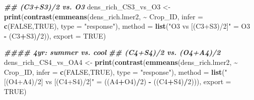 \documentclass[
]{article}
\newenvironment{Shaded}{\begin{snugshade}}{\end{snugshade}}
\newcommand{\AttributeTok}[1]{\textcolor[rgb]{0.13,0.29,0.53}{#1}}
\newcommand{\ConstantTok}[1]{\textcolor[rgb]{0.56,0.35,0.01}{#1}}
\newcommand{\DecValTok}[1]{\textcolor[rgb]{0.00,0.00,0.81}{#1}}
\newcommand{\DocumentationTok}[1]{\textcolor[rgb]{0.56,0.35,0.01}{\textbf{\textit{#1}}}}
\newcommand{\FunctionTok}[1]{\textcolor[rgb]{0.13,0.29,0.53}{\textbf{#1}}}
\newcommand{\NormalTok}[1]{#1}
\newcommand{\OtherTok}[1]{\textcolor[rgb]{0.56,0.35,0.01}{#1}}
\newcommand{\SpecialCharTok}[1]{\textcolor[rgb]{0.81,0.36,0.00}{\textbf{#1}}}
\newcommand{\StringTok}[1]{\textcolor[rgb]{0.31,0.60,0.02}{#1}}
\begin{document}
\begin{Shaded}
\begin{Highlighting}[]
\DocumentationTok{\#\# (C3+S3)/2 vs. O3}
\NormalTok{dens\_rich\_CS3\_vs\_O3 }\OtherTok{\textless{}{-}} \FunctionTok{print}\NormalTok{(}\FunctionTok{contrast}\NormalTok{(}\FunctionTok{emmeans}\NormalTok{(dens\_rich.lmer2, }\SpecialCharTok{\textasciitilde{}}\NormalTok{ Crop\_ID, }
                                              \AttributeTok{infer =} \FunctionTok{c}\NormalTok{(}\ConstantTok{FALSE}\NormalTok{,}\ConstantTok{TRUE}\NormalTok{),}
                                              \AttributeTok{type =} \StringTok{"response"}\NormalTok{),}
                                      \AttributeTok{method =} \FunctionTok{list}\NormalTok{(}\StringTok{"O3 vs [(C3+S3)/2]"} \OtherTok{=}\NormalTok{ O3 }\SpecialCharTok{{-}}\NormalTok{ (C3}\SpecialCharTok{+}\NormalTok{S3)}\SpecialCharTok{/}\DecValTok{2}\NormalTok{)),}
                             \AttributeTok{export =} \ConstantTok{TRUE}\NormalTok{)}

\DocumentationTok{\#\#\#\# 4yr: summer vs. cool}
\DocumentationTok{\#\# (C4+S4)/2 vs. (O4+A4)/2 }
\NormalTok{dens\_rich\_CS4\_vs\_OA4 }\OtherTok{\textless{}{-}} \FunctionTok{print}\NormalTok{(}\FunctionTok{contrast}\NormalTok{(}\FunctionTok{emmeans}\NormalTok{(dens\_rich.lmer2, }\SpecialCharTok{\textasciitilde{}}\NormalTok{ Crop\_ID,}
                                               \AttributeTok{infer =} \FunctionTok{c}\NormalTok{(}\ConstantTok{FALSE}\NormalTok{,}\ConstantTok{TRUE}\NormalTok{),}
                                               \AttributeTok{type =} \StringTok{"response"}\NormalTok{),}
                                       \AttributeTok{method =} \FunctionTok{list}\NormalTok{(}\StringTok{"[(O4+A4)/2] vs [(C4+S4)/2]"} \OtherTok{=} 
\NormalTok{                                                       ((A4}\SpecialCharTok{+}\NormalTok{O4)}\SpecialCharTok{/}\DecValTok{2}\NormalTok{) }\SpecialCharTok{{-}}\NormalTok{ ((C4}\SpecialCharTok{+}\NormalTok{S4)}\SpecialCharTok{/}\DecValTok{2}\NormalTok{))), }
                              \AttributeTok{export =} \ConstantTok{TRUE}\NormalTok{)}


\end{Highlighting}
\end{Shaded}
\end{document}
